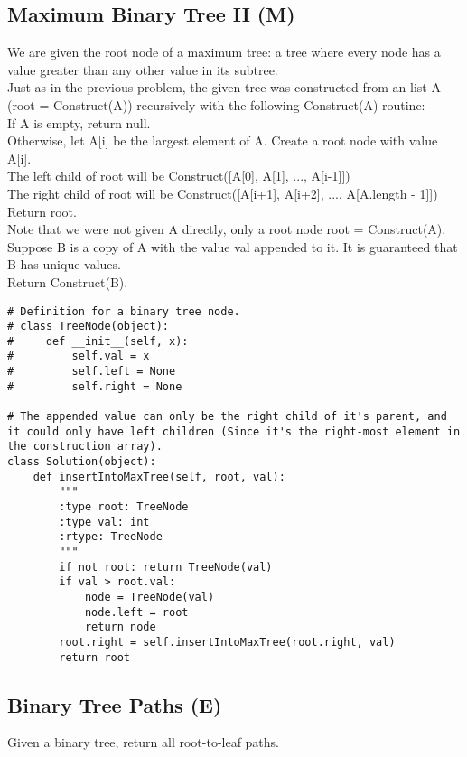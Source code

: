 \subsection{Maximum Binary Tree II (M)}
We are given the root node of a maximum tree: a tree where every node has a value greater than any other value in its subtree.\\

Just as in the previous problem, the given tree was constructed from an list A (root = Construct(A)) recursively with the following Construct(A) routine:\\

    If A is empty, return null.\\
    Otherwise, let A[i] be the largest element of A.  Create a root node with value A[i].\\
    The left child of root will be Construct([A[0], A[1], ..., A[i-1]])\\
    The right child of root will be Construct([A[i+1], A[i+2], ..., A[A.length - 1]])\\
    Return root.\\

Note that we were not given A directly, only a root node root = Construct(A).\\

Suppose B is a copy of A with the value val appended to it.  It is guaranteed that B has unique values.\\

Return Construct(B).\\

\begin{lstlisting}
# Definition for a binary tree node.
# class TreeNode(object):
#     def __init__(self, x):
#         self.val = x
#         self.left = None
#         self.right = None

# The appended value can only be the right child of it's parent, and it could only have left children (Since it's the right-most element in the construction array).
class Solution(object):
    def insertIntoMaxTree(self, root, val):
        """
        :type root: TreeNode
        :type val: int
        :rtype: TreeNode
        """
        if not root: return TreeNode(val)
        if val > root.val:
            node = TreeNode(val)
            node.left = root
            return node
        root.right = self.insertIntoMaxTree(root.right, val)
        return root
\end{lstlisting}


\subsection{Binary Tree Paths (E)}
Given a binary tree, return all root-to-leaf paths. \\

